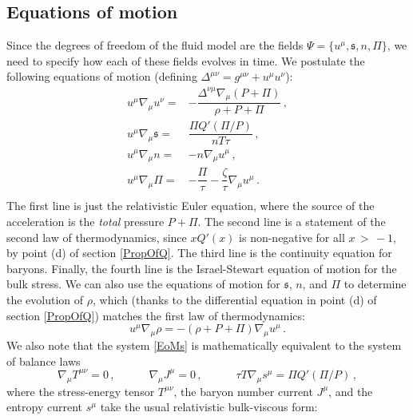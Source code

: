 \documentclass[a4paper, amsfonts, amssymb, amsmath, reprint, showkeys, nofootinbib, twoside,notitlepage,onecolumn]{revtex4-2}
\newcommand{\spc}{\quad \quad \quad}
\newcommand{\s}{{\mathfrak{s}}}
\theoremstyle{definition}
\theoremstyle{theorem}
\theoremstyle{corollary}
\begin{document}
\subsection{Equations of motion}
\vspace{-0.2cm}

Since the degrees of freedom of the fluid model are the fields $\Psi=\{u^\mu,\s,n,\Pi \}$, we need to specify how each of these fields evolves in time. We postulate the following equations of motion (defining $\Delta^{\mu \nu}=g^{\mu \nu}+u^\mu u^\nu$):
\begin{equation}\label{EoMs}
\begin{split}
u^\mu \nabla_\mu u^\nu ={}& - \dfrac{ \Delta^{\nu \mu} \nabla_\mu (P{+}\Pi)}{\rho {+}P{+}\Pi} \, , \\
u^\mu \nabla_\mu \s ={}& \dfrac{\Pi Q'(\Pi/P)}{nT\tau} \, , \\
u^\mu \nabla_\mu n ={}& - n\nabla_\mu u^\mu \, , \\
 u^\mu \nabla_\mu \Pi ={}& -\dfrac{\Pi}{\tau} -\dfrac{\zeta}{\tau} \nabla_\mu u^\mu \, . \\
\end{split}
\end{equation}
The first line is just the relativistic Euler equation, where the source of the acceleration is the \textit{total} pressure $P+\Pi$. The second line is a statement of the second law of thermodynamics, since $xQ'(x)$ is non-negative for all $x\,{>}\,{-}1$, by point (d) of section \ref{PropOfQ}. The third line is the continuity equation for baryons. Finally, the fourth line is the Israel-Stewart equation of motion for the bulk stress. We can also use the equations of motion for $\s$, $n$, and $\Pi$ to determine the evolution of $\rho$, which (thanks to the differential equation in point (d) of section \ref{PropOfQ}) matches the first law of thermodynamics:
\begin{equation}\label{energumeno}
u^\mu \nabla_\mu \rho = - (\rho{+}P{+}\Pi)\nabla_\mu u^\mu \, .
\end{equation}
We also note that the system \eqref{EoMs} is mathematically equivalent to the system of balance laws
\begin{equation}\label{BalanceLaws}
\nabla_\mu T^{\mu \nu}= 0 \, , \spc
\nabla_\mu J^\mu = 0 \, ,\spc
\tau T\nabla_\mu s^{\mu}= \Pi Q'(\Pi/P) \, ,
\end{equation}
where the stress-energy tensor $T^{\mu \nu}$, the baryon number current $J^\mu$, and the entropy current $s^\mu$ take the usual relativistic bulk-viscous form:
\end{document}
